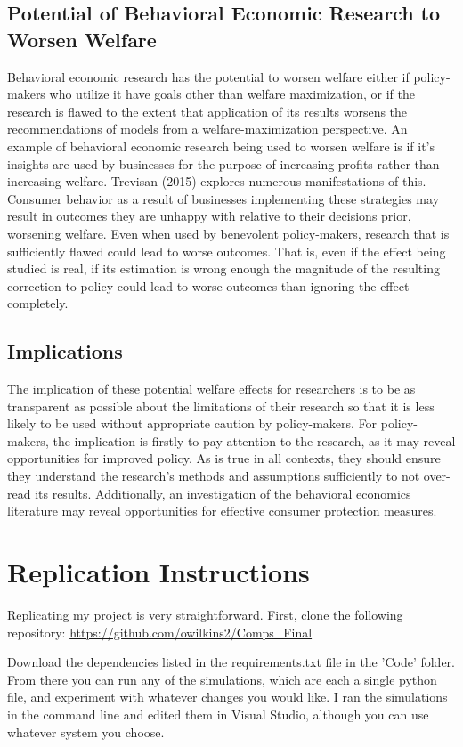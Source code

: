\documentclass[10pt,twocolumn]{article}
\begin{document}
\subsection{Potential of Behavioral Economic Research to Worsen Welfare}
Behavioral economic research has the potential to worsen welfare either if policy-makers who utilize it have goals other than welfare maximization, or if the research is flawed to the extent that application of its results worsens the recommendations of models from a welfare-maximization perspective. An example of behavioral economic research being used to worsen welfare is if it's insights are used by businesses for the purpose of increasing profits rather than increasing welfare. Trevisan (2015) explores numerous manifestations of this.\cite{Trevisan} Consumer behavior as a result of businesses implementing these strategies may result in outcomes they are unhappy with relative to their decisions prior, worsening welfare. Even when used by benevolent policy-makers, research that is sufficiently flawed could lead to worse outcomes. That is, even if the effect being studied is real, if its estimation is wrong enough the magnitude of the resulting correction to policy could lead to worse outcomes than ignoring the effect completely.

\subsection{Implications}
The implication of these potential welfare effects for researchers is to be as transparent as possible about the limitations of their research so that it is less likely to be used without appropriate caution by policy-makers. For policy-makers, the implication is firstly to pay attention to the research, as it may reveal opportunities for improved policy. As is true in all contexts, they should ensure they understand the research's methods and assumptions sufficiently to not over-read its results. Additionally, an investigation of the behavioral economics literature may reveal opportunities for effective consumer protection measures. 

\printbibliography
\appendix
\section{Replication Instructions}
Replicating my project is very straightforward. First, clone the following repository: \url{https://github.com/owilkins2/Comps_Final} 

Download the dependencies listed in the requirements.txt file in the 'Code' folder. From there you can run any of the simulations, which are each a single python file, and experiment with whatever changes you would like. I ran the simulations in the command line and edited them in Visual Studio, although you can use whatever system you choose. 
\end{document}
